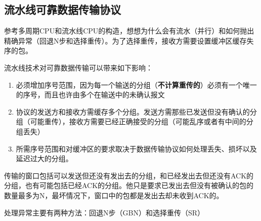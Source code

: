 \documentclass[]{report}
\begin{document}
		\subsection{流水线可靠数据传输协议}
			参考多周期CPU和流水线CPU的构造，想想为什么会有流水（并行）和如何抛出精确异常（回退N步和选择重传）。为了选择重传，接收方需要设置缓冲区缓存失序的包。\par
			流水线技术对可靠数据传输可以带来如下影响：
			\begin{enumerate}
				\item 必须增加序号范围，因为每一个输送的分组（\textbf{不计算重传的}）必须有一个唯一的序号，而且也许由多个在输送中的未确认报文
				\item 协议的发送方和接收方需缓存多个分组。发送方需那些已发送但没有确认的分组（可能重传），接收方需要已经正确接受的分组（可能乱序或者有中间的分组丢失）
				\item 所需序号范围和对缓冲区的要求取决于数据传输协议如何处理丢失、损坏以及延迟过大的分组。
			\end{enumerate}\par
			传输的窗口包括可以发送但还没有发出去的分组，和已经发出去但还没有ACK的分组，也有可能包括已经ACK的分组。他只是要求已发出去但没有被确认的包的数量最多为N，最坏情况下，窗口中的包都是发出去却未收到ACK的。\par
			处理异常主要有两种方法：回退N步（GBN）和选择重传（SR）
\end{document}
